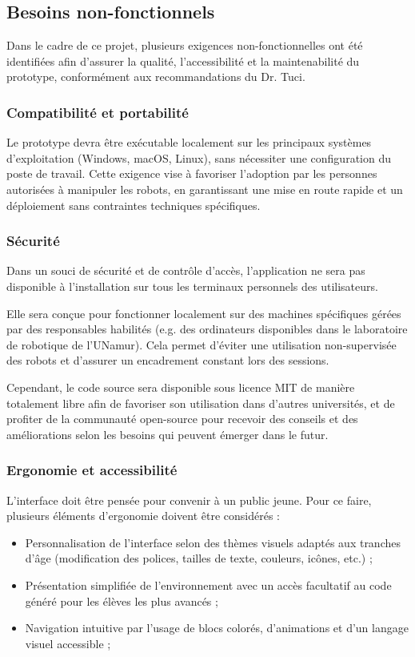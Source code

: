 \subsection{Besoins non-fonctionnels} \label{sec:non-functional_specs}

Dans le cadre de ce projet, plusieurs exigences non-fonctionnelles ont été identifiées afin d’assurer la qualité, l’accessibilité et la maintenabilité du prototype, conformément aux recommandations du Dr. Tuci.

\subsubsection{Compatibilité et portabilité}
Le prototype devra être exécutable localement sur les principaux systèmes d’exploitation (Windows, macOS, Linux), sans nécessiter une configuration du poste de travail. 
Cette exigence vise à favoriser l’adoption par les personnes autorisées à manipuler les robots, en garantissant une mise en route rapide et un déploiement sans contraintes techniques spécifiques.

\subsubsection{Sécurité}
Dans un souci de sécurité et de contrôle d’accès, l’application ne sera pas disponible à l'installation sur tous les terminaux personnels des utilisateurs.

Elle sera conçue pour fonctionner localement sur des machines spécifiques gérées par des responsables habilités (e.g. des ordinateurs disponibles dans le laboratoire de robotique de l'UNamur).
Cela permet d’éviter une utilisation non-supervisée des robots et d’assurer un encadrement constant lors des sessions.

Cependant, le code source sera disponible sous licence MIT de manière totalement libre afin de favoriser son utilisation dans d'autres universités, et de profiter de la communauté open-source pour recevoir des conseils et des améliorations selon les besoins qui peuvent émerger dans le futur.

\subsubsection{Ergonomie et accessibilité}
L’interface doit être pensée pour convenir à un public jeune.
Pour ce faire, plusieurs éléments d’ergonomie doivent être considérés :
\begin{itemize}
    \item Personnalisation de l’interface selon des thèmes visuels adaptés aux tranches d’âge (modification des polices, tailles de texte, couleurs, icônes, etc.) ;
    
    \item Présentation simplifiée de l’environnement avec un accès facultatif au code généré pour les élèves les plus avancés ;
    
    \item Navigation intuitive par l’usage de blocs colorés, d’animations et d’un langage visuel accessible ;
\end{itemize}

